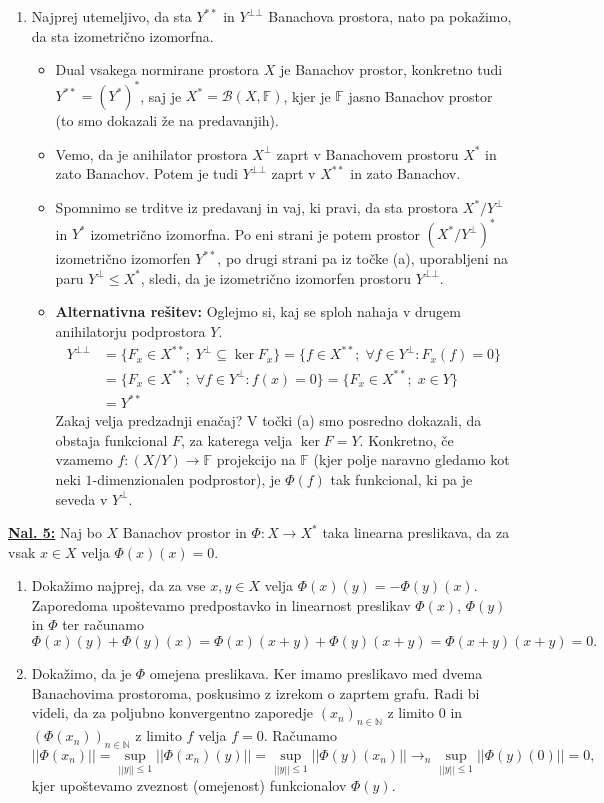 \documentclass[a4paper, 12pt]{article}
\newcommand{\N}{\mathbb{N}}
\newcommand{\F}{\mathbb{F}}
\begin{document}
\begin{enumerate}[label=(\alph*)]
	\item Najprej utemeljivo, da sta $Y^{**}$ in $Y^{\bot\bot}$ Banachova prostora, nato pa pokažimo, da sta izometrično izomorfna.
	\begin{itemize}
		\item Dual vsakega normirane prostora $X$ je Banachov prostor, konkretno tudi $Y^{**} = (Y^*)^*$, saj je $X^* = \mathcal{B}(X, \F)$, kjer je $\F$ jasno Banachov prostor (to smo dokazali že na predavanjih).
		\item Vemo, da je anihilator prostora $X^\bot$ zaprt v Banachovem prostoru $X^*$ in zato Banachov. Potem je tudi $Y^{\bot\bot}$ zaprt v $X^{**}$ in zato Banachov.
		\item Spomnimo se trditve iz predavanj in vaj, ki pravi, da sta prostora $X^*/Y^\bot$ in $Y^*$ izometrično izomorfna. Po eni strani je potem prostor $(X^*/Y^\bot)^*$ izometrično izomorfen $Y^{**}$, po drugi strani pa iz točke (a), uporabljeni na paru $Y^\bot \leq X^*$, sledi, da je izometrično izomorfen prostoru $Y^{\bot\bot}$.
		\item \textbf{Alternativna rešitev:} Oglejmo si, kaj se sploh nahaja v drugem anihilatorju podprostora $Y$.
		\begin{align*}
		Y^{\bot\bot}  &= \lbrace F_x \in X^{**} ; \;  Y^\bot \subseteq \ker F_x \rbrace =  \lbrace f \in X^{**} ; \; \forall f \in Y^\bot\colon F_x(f) = 0\rbrace\\
		&= \lbrace F_x \in X^{**} ; \; \forall f \in Y^\bot\colon f(x) = 0\rbrace = \lbrace F_x \in X^{**} ; \; x \in Y\rbrace\\
		&= Y^{**}
		\end{align*}
		Zakaj velja predzadnji enačaj? V točki (a) smo posredno dokazali, da obstaja funkcional $F$, za katerega velja $\ker F = Y$. Konkretno, če vzamemo $f\colon (X/Y) \to \F$ projekcijo na $\F$ (kjer polje naravno gledamo kot neki $1$-dimenzionalen podprostor), je $\Phi(f)$ tak funkcional, ki pa je seveda v $Y^\bot$.
	\end{itemize}
\end{enumerate}

\underline{\textbf{Nal. 5:}}
Naj bo $X$ Banachov prostor in $\Phi\colon X \to X^*$ taka linearna preslikava, da za vsak $x \in X$ velja $\Phi(x)(x) = 0$.
\begin{enumerate}[label=(\alph*)]
	\item Dokažimo najprej, da za vse $x, y \in X$ velja $\Phi(x)(y) = -\Phi(y)(x)$.
	Zaporedoma upoštevamo predpostavko in linearnost preslikav $\Phi(x)$, $\Phi(y)$ in $\Phi$ ter računamo
	\[
	\Phi(x)(y) + \Phi(y)(x) = \Phi(x)(x+y) + \Phi(y)(x+y) = \Phi(x+y)(x+y) = 0.
	\]
	\item Dokažimo, da je $\Phi$ omejena preslikava.
	Ker imamo preslikavo med dvema Banachovima prostoroma, poskusimo z izrekom o zaprtem grafu. Radi bi videli, da za poljubno konvergentno zaporedje $(x_n)_{n\in\N}$ z limito $0$ in $(\Phi(x_n))_{n\in\N}$ z limito $f$ velja $f = 0$.
	Računamo
	\[
	||\Phi(x_n)|| = \sup_{||y||\leq 1}||\Phi(x_n)(y)|| = \sup_{||y||\leq 1}||\Phi(y)(x_n)|| \longrightarrow_n \sup_{||y||\leq 1} ||\Phi(y)(0)|| = 0,
	\]
	kjer upoštevamo zveznost (omejenost) funkcionalov $\Phi(y)$.
\end{enumerate}
\end{document}
